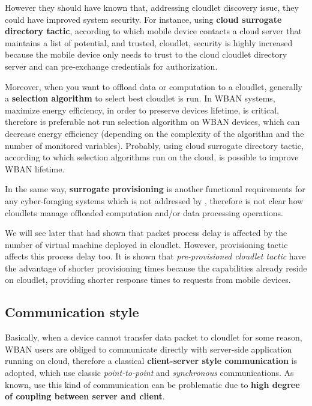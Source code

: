 \documentclass[sigchi]{acmart}
\begin{document}
However they should have known that, addressing cloudlet discovery issue, they could have improved system security. For instance, using \textbf{cloud surrogate directory tactic}, according to which mobile device contacts a cloud server that maintains a list of potential, and trusted, cloudlet, security is highly increased because the mobile device only needs to trust to the cloud cloudlet directory server and can pre-exchange credentials for authorization. 

Moreover, when you want to offload data or computation to a cloudlet, generally a \textbf{selection algorithm} to select best cloudlet is run. In WBAN systems, maximize energy efficiency, in order to preserve devices lifetime, is critical, therefore is preferable not run selection algorithm on WBAN devices, which can decrease energy efficiency (depending on the complexity of the algorithm and the number of monitored variables). Probably, using cloud surrogate directory tactic, according to which selection algorithms run on the cloud, is possible to improve WBAN lifetime. \cite{DecisionModel}

In the same way, \textbf{surrogate provisioning} is another functional requirements for any cyber-foraging systems which is not addressed by \citet{MSAReport}, therefore is not clear how cloudlets manage offloaded computation and/or data processing operations.

We will see later that \citet{MSAReport} had shown that packet process delay is affected by the number of virtual machine deployed in cloudlet. However, provisioning tactic affects this process delay too. It is shown that \textit{pre-provisioned cloudlet tactic} have the advantage of shorter provisioning times because the capabilities already reside on cloudlet, providing shorter response times to requests from mobile devices.\cite{DecisionModel}

\subsection{Communication style}

Basically, when a device cannot transfer data packet to cloudlet for some reason, WBAN users are obliged to communicate directly with server-side application running on cloud, therefore a classical \textbf{client-server style communication} is adopted, which use classic \textit{point-to-point} and \textit{synchronous} communications. As known, use this kind of communication can be problematic due to \textbf{high degree of coupling between server and client}.
\end{document}
